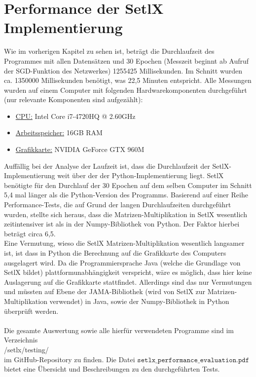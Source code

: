 \section{Performance der SetlX Implementierung}
Wie im vorherigen Kapitel zu sehen ist, beträgt die Durchlaufzeit des Programmes mit allen Datensätzen und 30 Epochen (Messzeit beginnt ab Aufruf der SGD-Funktion des Netzwerkes) 1255425 Millisekunden. Im Schnitt wurden ca. 1350000 Millisekunden benötigt, was 22,5 Minuten entspricht. Alle Messungen wurden auf einem Computer mit folgenden Hardwarekomponenten durchgeführt (nur relevante Komponenten sind aufgezählt):
\begin{itemize}
	\item \underline{CPU:} Intel Core i7-4720HQ @ 2.60GHz
	\item \underline{Arbeitsspeicher:} 16GB RAM
	\item \underline{Grafikkarte:} NVIDIA GeForce GTX 960M
\end{itemize}
Auffällig bei der Analyse der Laufzeit ist, dass die Durchlaufzeit der SetlX-Implementierung weit über der der Python-Implementierung liegt. SetlX benötigte für den Durchlauf der 30 Epochen auf dem selben Computer im Schnitt 5,4 mal länger als die Python-Version des Programms. Basierend auf einer Reihe Performance-Tests, die auf Grund der langen Durchlaufzeiten durchgeführt wurden, stellte sich heraus, dass die Matrizen-Multiplikation in SetlX wesentlich zeitintensiver ist als in der Numpy-Bibliothek von Python. Der Faktor hierbei beträgt circa 6,5. \\
Eine Vermutung, wieso die SetlX Matrizen-Multiplikation wesentlich langsamer ist, ist dass in Python die Berechnung auf die Grafikkarte des Computers ausgelagert wird. Da die Programmiersprache Java (welche die Grundlage von SetlX bildet) plattformunabhängigkeit verspricht, wäre es möglich, dass hier keine Auslagerung auf die Grafikkarte stattfindet. Allerdings sind das nur Vermutungen und müssten auf Ebene der JAMA-Bibliothek (wird von SetlX zur Matrizen-Multiplikation verwendet) in Java, sowie der Numpy-Bibliothek in Python überprüft werden. \\ \\
Die gesamte Auswertung sowie alle hierfür verwendeten Programme sind im Verzeichnis
\\[0.2cm]
\hspace*{1.3cm}
/setlx/testing/
\\[0.2cm]
im GitHub-Repository zu finden. Die Datei $\mathtt{setlx\_performance\_evaluation.pdf}$ bietet eine Übersicht und Beschreibungen zu den durchgeführten Tests.